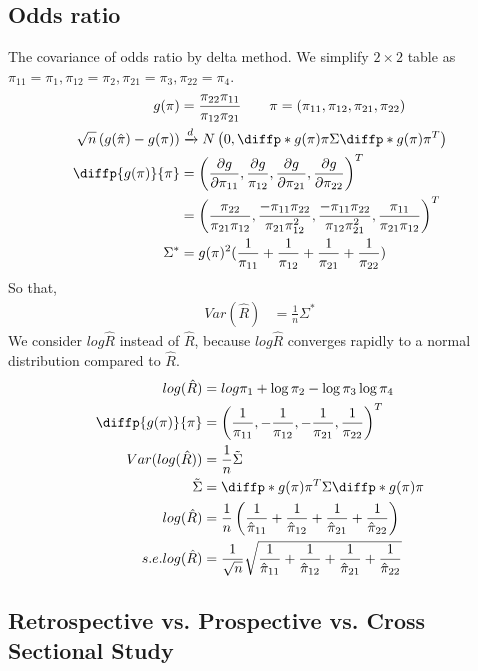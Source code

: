 \subsection{Odds ratio}
	The covariance of odds ratio by delta method. We simplify $2 \times 2$ table as $\pi_{11} = \pi_1, \pi_{12} = \pi_2, \pi_{21} = \pi_3, \pi_{22} = \pi_4$.
	\begin{align*}
		g(\pi) &= \frac{\pi_{22}\pi_{11}}{\pi_{12}\pi_{21}} \qquad \pi=(\pi_{11}, \pi_{12}, \pi_{21}, \pi_{22})\\
		\sqrt{n} \left( g(\hat{\pi}) - g({\pi}) \right) & \xrightarrow[]{d} N \left(0, \diffp*{g(\pi)}{\pi}{} \Sigma \diffp*{g(\pi)}{\pi}{}^T \right)\\
		\diffp{g(\pi)}{\pi}  &= \left( \frac{\partial g}{\partial \pi_{11}}, \frac{\partial g}{\pi_{12}}, \frac{\partial g}{\partial \pi_{21}}, \frac{\partial g}{\partial \pi_{22}} \right)^T\\
		& = \left( \frac{\pi_{22}}{\pi_{21}\pi_{12}}, \frac{-\pi_{11}\pi_{22}}{\pi_{21}\pi_{12}^2}, \frac{-\pi_{11}\pi_{22}}{\pi_{12}\pi_{21}^2}, \frac{\pi_{11}}{\pi_{21}\pi_{12}} \right)^T\\
		\Sigma^{\ast} &= g(\pi)^2(\frac{1}{\pi_{11}} + \frac{1}{\pi_{12}} + \frac{1}{\pi_{21}} + \frac{1}{\pi_{22}})
	\end{align*} 
	So that,
	\begin{align*}
		Var(\hat R) &=  \frac{1}{n} \Sigma^{\ast} 
	\end{align*} 
	We consider $log \hat R$ instead of $\hat R$, because $log \hat R$ converges rapidly to a normal distribution compared to $\hat R$.
	\begin{align*}
		log(\hat{R}) &= log \pi_1 + \log \pi_2 - \log \pi_3  \log \pi_4\\
		\diffp{g(\pi)}{\pi}  &= \left(\frac{1}{\pi_{11}} , -\frac{1}{\pi_{12}}, -\frac{1}{\pi_{21}}, \frac{1}{\pi_{22}} \right)^T\\
		Var(log(\hat{R})) &= \frac{1}{n} \Tilde{\Sigma} \\
		\Tilde{\Sigma} &= \diffp*{g(\pi)}{\pi}{}^T \Sigma \diffp*{g(\pi)}{\pi}{}\\
		log(\hat R) &=  \frac{1}{n}\left( \frac{1}{\hat \pi_{11}} + \frac{1}{\hat \pi_{12}} + \frac{1}{\hat \pi_{21}} + \frac{1}{\hat \pi_{22}} \right)\\
		s.e. log(\hat R) &=  \frac{1}{\sqrt{n}} \sqrt{\frac{1}{\hat \pi_{11}} + \frac{1}{\hat \pi_{12}} + \frac{1}{\hat \pi_{21}} + \frac{1}{\hat \pi_{22}}} 
	\end{align*} 
\subsection{Retrospective vs. Prospective vs. Cross Sectional Study}
